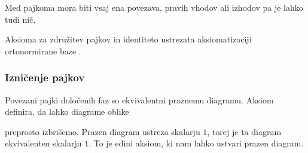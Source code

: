 \documentclass[mat1]{fmfdelo}
\begin{document}
Med pajkoma mora biti vsaj ena povezava, pravih vhodov ali izhodov pa je lahko tudi nič.

Aksioma za združitev pajkov in identiteto ustrezata aksiomatizaciji ortonormirane baze \cite[poglavje 5]{coecke_pavlovic_vicary_2013}.

\subsubsection{Izničenje pajkov} \label{iznicenje}
Povezani pajki določenih faz so ekvivalentni praznemu diagramu. Aksiom definira, da lahko diagrame oblike
\begin{center}
\end{center}
preprosto izbrišemo. Prazen diagram ustreza skalarju \(1\), torej je ta diagram ekvivalenten skalarju \(1\). To je edini aksiom, ki nam lahko ustvari prazen diagram.
%
%
\end{document}
